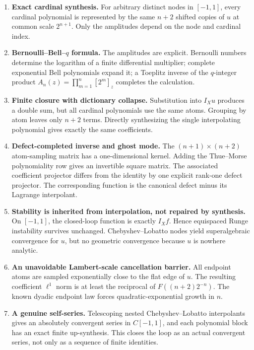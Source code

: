 \documentclass[11pt,oneside]{article}
\theoremstyle{definition}
\theoremstyle{remark}
\newcommand{\1}{\mathbf{1}}
\begin{document}
\begin{enumerate}[label=\textbf{R\arabic*.},leftmargin=3.5em]
\item \textbf{Exact cardinal synthesis.}
For arbitrary distinct nodes in $[-1,1]$, every cardinal polynomial is
represented by the same $n+2$ shifted copies of $u$ at common scale
$2^{n+1}$.  Only the amplitudes depend on the node and cardinal index.

\item \textbf{Bernoulli--Bell--$q$ formula.}
The amplitudes are explicit.  Bernoulli numbers determine the logarithm of a
finite differential multiplier; complete exponential Bell polynomials
expand it; a Toeplitz inverse of the $q$-integer product
$A_n(z)=\prod_{m=1}^n[2^m]_z$ completes the calculation.

\item \textbf{Finite closure with dictionary collapse.}
Substitution into $I_Xu$ produces a double sum, but all cardinal polynomials
use the same atoms.  Grouping by atom leaves only $n+2$ terms.  Directly
synthesizing the single interpolating polynomial gives exactly the same
coefficients.

\item \textbf{Defect-completed inverse and ghost mode.}
The $(n+1)\times(n+2)$ atom-sampling matrix has a one-dimensional kernel.
Adding the Thue--Morse polynomiality row gives an invertible square matrix.
The associated coefficient projector differs from the identity by one
explicit rank-one defect projector.  The corresponding function is the
canonical defect minus its Lagrange interpolant.

\item \textbf{Stability is inherited from interpolation, not repaired by
synthesis.}
On $[-1,1]$, the closed-loop function is exactly $I_Xf$.  Hence equispaced
Runge instability survives unchanged.  Chebyshev--Lobatto nodes yield
superalgebraic convergence for $u$, but no geometric convergence because $u$
is nowhere analytic.

\item \textbf{An unavoidable Lambert-scale cancellation barrier.}
All endpoint atoms are sampled exponentially close to the flat edge of $u$.
The resulting coefficient $\ell^1$ norm is at least the reciprocal of
$F((n+2)2^{-n})$.  The known dyadic endpoint law forces quadratic-exponential
growth in $n$.

\item \textbf{A genuine self-series.}
Telescoping nested Chebyshev--Lobatto interpolants gives an absolutely
convergent series in $C[-1,1]$, and each polynomial block has an exact finite
up-synthesis.  This closes the loop as an actual convergent series, not only
as a sequence of finite identities.
\end{enumerate}
\end{document}

